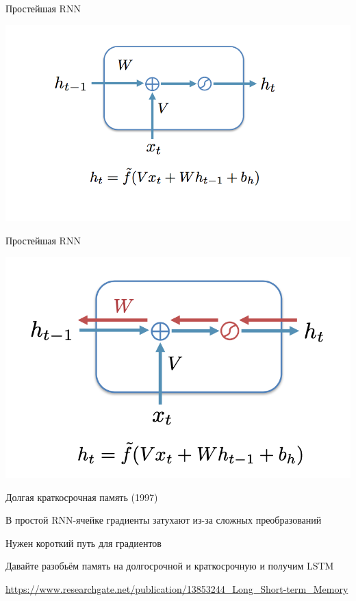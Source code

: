 \documentclass[notes,12pt, aspectratio=169]{beamer}
\newenvironment{wideitemize}{\itemize\addtolength{\itemsep}{10pt}}{\enditemize}
\begin{document}
\begin{frame}{Простейшая RNN}
\begin{center}
	\includegraphics[width=.8\linewidth]{rnn14.png}
\end{center}
\end{frame}


\begin{frame}{Простейшая RNN}
\begin{center}
	\includegraphics[width=.65\linewidth]{rnn14_2.png}
\end{center}
\end{frame}


\begin{frame}{Долгая краткосрочная память (1997)}
\begin{wideitemize}
	\item В  простой RNN-ячейке градиенты затухают из-за сложных преобразований
	\item Нужен короткий путь для градиентов 
	\item Давайте разобьём память на долгосрочной и краткосрочную и получим LSTM
\end{wideitemize}

\vspace{2.5cm}
\footnotesize 
\color{blue} \url{https://www.researchgate.net/publication/13853244\_Long\_Short-term\_Memory} 
\end{frame}
\end{document}

